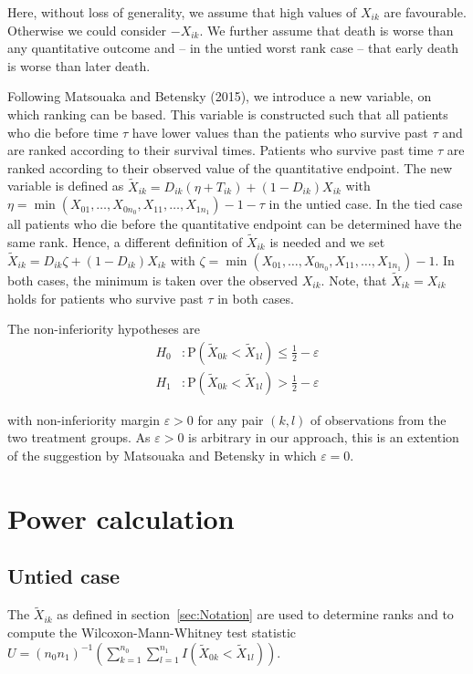\documentclass[bimj,fleqn]{w-art}\usepackage[]{graphicx}\usepackage[]{color}
\theoremstyle{plain}
\theoremstyle{definition}
\begin{document}
Here, without loss of generality, we assume that high values of $X_{ik}$ are
favourable. Otherwise we could consider $-X_{ik}$. We further assume that
death is worse than any quantitative outcome and -- in the untied worst rank
case -- that early death is worse than later death.

Following Matsouaka and Betensky (2015), we introduce a new variable, on which
ranking can be based. This variable is constructed such that all patients who
die before time $\tau$ have lower values than the patients who survive past
$\tau$ and are ranked according to their survival times. Patients who survive
past time $\tau$ are ranked according to their observed value of the quantitative
endpoint. The new variable is defined as
$\widetilde{X}_{ik} = D_{ik}(\eta  + T_{ik}) + (1 - D_{ik})X_{ik}$ with
$\eta = \min(X_{01}, \ldots, X_{0n_0}, X_{11}, \ldots, X_{1n_1}) - 1 - \tau$
in the untied case. In the tied case all patients who die before the quantitative endpoint
can be determined have the same rank. Hence, a different definition of $\widetilde{X}_{ik}$
is needed and we set  $\widetilde{X}_{ik} = D_{ik}\zeta   + (1 - D_{ik})X_{ik}$
with $\zeta = \min(X_{01}, \ldots, X_{0n_0}, X_{11}, \ldots, X_{1n_1}) - 1$.
In both cases, the minimum is taken over the observed $X_{ik}$.
Note, that  $\widetilde{X}_{ik} = {X}_{ik}$ holds for patients who survive past $\tau$ in both cases.

  The non-inferiority hypotheses are
\begin{align*}
  H_0 &:  \text{P}(\widetilde{X}_{0k} < \widetilde{X}_{1l})
          \leq \frac{1}{2} - \varepsilon \\
H_1 &:  \text{P}(\widetilde{X}_{0k} < \widetilde{X}_{1l})
          > \frac{1}{2} - \varepsilon
\end{align*}

with non-inferiority margin $\varepsilon > 0$ for any pair $(k, l)$ of
observations from the two treatment groups. As $\varepsilon > 0 $ is arbitrary
in our approach, this is an extention of the suggestion by Matsouaka and
Betensky in which $\varepsilon = 0 $.

\section{Power calculation}
\label{sec:Power}
\subsection{Untied case}
\label{sec:PowerUntied}
The $\widetilde{X}_{ik}$ as defined in section~\ref{sec:Notation} are used to
  determine ranks and to compute the Wilcoxon-Mann-Whitney test statistic
  $ U =(n_0 n_1)^{-1}(\sum_{k=1}^{n_0}
    \sum_{l=1}^{n_1}I(\widetilde{X}_{0k} < \widetilde{X}_{1l})) $.
\end{document}
